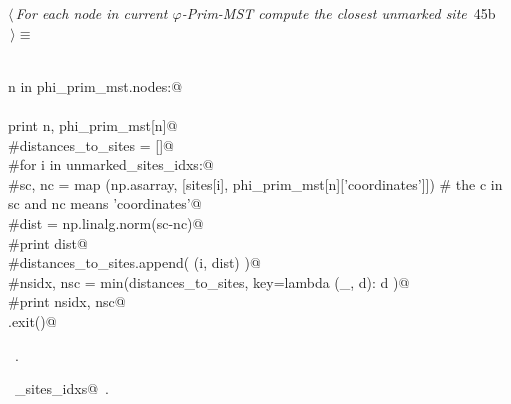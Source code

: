 \documentclass[11.5pt]{report}
\begin{document}
\vspace{-0.8cm}\newchunk
\begin{flushleft} \small
\begin{minipage}{\linewidth}\label{scrap63}\raggedright\small
{} $\langle\,${\itshape For each node in current $\varphi$-Prim-MST compute the closest unmarked site}\nobreak\ {\footnotesize {45b}}$\,\rangle\equiv$
\vspace{-1ex}
\begin{list}{}{} \item
\mbox{}\verb@@\\
\mbox{}\verb@for n in phi_prim_mst.nodes:@\\
\mbox{}\verb@@\\
\mbox{}\verb@     print n, phi_prim_mst[n]@\\
\mbox{}\verb@     #distances_to_sites = []@\\
\mbox{}\verb@     #for i in unmarked_sites_idxs:@\\
\mbox{}\verb@          #sc, nc = map (np.asarray, [sites[i], phi_prim_mst[n]['coordinates']]) # the c in sc and nc means 'coordinates'@\\
\mbox{}\verb@          #dist =  np.linalg.norm(sc-nc)@\\
\mbox{}\verb@          #print dist@\\
\mbox{}\verb@          #distances_to_sites.append( (i, dist) )@\\
\mbox{}\verb@     #nsidx, nsc = min(distances_to_sites, key=lambda (_, d): d )@\\
\mbox{}\verb@     #print nsidx, nsc@\\
\mbox{}\verb@sys.exit()@\\
\mbox{}\verb@@{\NWsep}
\end{list}
\vspace{-1.5ex}
\footnotesize
\begin{list}{}{\setlength{\itemsep}{-\parsep}\setlength{\itemindent}{-\leftmargin}}
\item \NWtxtMacroRefIn\ .
\item \NWtxtIdentsUsed\nobreak\  \verb@unmarked_sites_idxs@\nobreak\ .
\item{}
\end{list}
\end{minipage}\vspace{4ex}
\end{flushleft}
\end{document}
